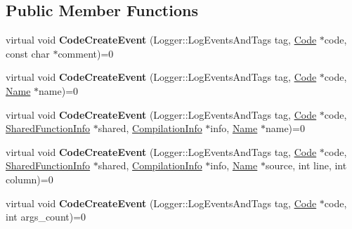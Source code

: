 \subsection*{Public Member Functions}
\begin{DoxyCompactItemize}
\item 
\hypertarget{classv8_1_1internal_1_1_code_event_listener_a7cce66baa492be6302d3d78cd3408134}{}virtual void {\bfseries Code\+Create\+Event} (Logger\+::\+Log\+Events\+And\+Tags tag, \hyperlink{classv8_1_1internal_1_1_code}{Code} $\ast$code, const char $\ast$comment)=0\label{classv8_1_1internal_1_1_code_event_listener_a7cce66baa492be6302d3d78cd3408134}

\item 
\hypertarget{classv8_1_1internal_1_1_code_event_listener_a1b546ff644b593ab5fbc3fb032c4b21f}{}virtual void {\bfseries Code\+Create\+Event} (Logger\+::\+Log\+Events\+And\+Tags tag, \hyperlink{classv8_1_1internal_1_1_code}{Code} $\ast$code, \hyperlink{classv8_1_1internal_1_1_name}{Name} $\ast$name)=0\label{classv8_1_1internal_1_1_code_event_listener_a1b546ff644b593ab5fbc3fb032c4b21f}

\item 
\hypertarget{classv8_1_1internal_1_1_code_event_listener_a6d315fe66dcdefd93335724e8841d707}{}virtual void {\bfseries Code\+Create\+Event} (Logger\+::\+Log\+Events\+And\+Tags tag, \hyperlink{classv8_1_1internal_1_1_code}{Code} $\ast$code, \hyperlink{classv8_1_1internal_1_1_shared_function_info}{Shared\+Function\+Info} $\ast$shared, \hyperlink{classv8_1_1internal_1_1_compilation_info}{Compilation\+Info} $\ast$info, \hyperlink{classv8_1_1internal_1_1_name}{Name} $\ast$name)=0\label{classv8_1_1internal_1_1_code_event_listener_a6d315fe66dcdefd93335724e8841d707}

\item 
\hypertarget{classv8_1_1internal_1_1_code_event_listener_a869ad05c06183a3c2c957d09b17a7082}{}virtual void {\bfseries Code\+Create\+Event} (Logger\+::\+Log\+Events\+And\+Tags tag, \hyperlink{classv8_1_1internal_1_1_code}{Code} $\ast$code, \hyperlink{classv8_1_1internal_1_1_shared_function_info}{Shared\+Function\+Info} $\ast$shared, \hyperlink{classv8_1_1internal_1_1_compilation_info}{Compilation\+Info} $\ast$info, \hyperlink{classv8_1_1internal_1_1_name}{Name} $\ast$source, int line, int column)=0\label{classv8_1_1internal_1_1_code_event_listener_a869ad05c06183a3c2c957d09b17a7082}

\item 
\hypertarget{classv8_1_1internal_1_1_code_event_listener_a4122dec151d2b3f9f97b1b6ff6716ed5}{}virtual void {\bfseries Code\+Create\+Event} (Logger\+::\+Log\+Events\+And\+Tags tag, \hyperlink{classv8_1_1internal_1_1_code}{Code} $\ast$code, int args\+\_\+count)=0\label{classv8_1_1internal_1_1_code_event_listener_a4122dec151d2b3f9f97b1b6ff6716ed5}


\end{DoxyCompactItemize}
